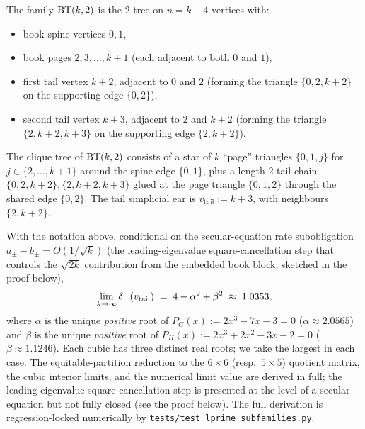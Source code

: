 The family $\mathrm{BT}(k,2)$ is the $2$-tree on $n = k + 4$ vertices with:
\begin{itemize}
\item book-spine vertices $0, 1$,
\item book pages $2, 3, \ldots, k+1$ (each adjacent to both $0$ and $1$),
\item first tail vertex $k+2$, adjacent to $0$ and $2$ (forming the
triangle $\{0, 2, k+2\}$ on the supporting edge $\{0, 2\}$),
\item second tail vertex $k+3$, adjacent to $2$ and $k+2$ (forming the
triangle $\{2, k+2, k+3\}$ on the supporting edge $\{2, k+2\}$).
\end{itemize}
The clique tree of $\mathrm{BT}(k,2)$ consists of a star of $k$ ``page''
triangles $\{0, 1, j\}$ for $j \in \{2, \ldots, k+1\}$ around the
spine edge $\{0, 1\}$, plus a length-$2$ tail chain
$\{0, 2, k+2\}, \{2, k+2, k+3\}$ glued at the page triangle
$\{0, 1, 2\}$ through the shared edge $\{0, 2\}$. The tail simplicial
ear is $v_{\mathrm{tail}} := k + 3$, with neighbours $\{2, k+2\}$.

\begin{proposition}
\label{thm:BT-asymptotic}
With the notation above, conditional on the secular-equation rate
subobligation $a_{\pm} - b_{\pm} = O(1/\sqrt{k})$ (the
leading-eigenvalue square-cancellation step that controls the
$\sqrt{2k}$ contribution from the embedded book block; sketched in the
proof below),
\[
\lim_{k \to \infty} \delta^{-}(v_{\mathrm{tail}})
\;=\; 4 - \alpha^{2} + \beta^{2}
\;\approx\; 1.0353,
\]
where $\alpha$ is the unique \emph{positive} root of
$P_{G}(x) := 2x^{3} - 7x - 3 = 0$ ($\alpha \approx 2.0565$) and
$\beta$ is the unique \emph{positive} root of
$P_{H}(x) := 2x^{3} + 2x^{2} - 3x - 2 = 0$ ($\beta \approx 1.1246$).
Each cubic has three distinct real roots; we take the largest in each
case. The equitable-partition reduction to the $6 \times 6$ (resp.\
$5 \times 5$) quotient matrix, the cubic interior limits, and the
numerical limit value are derived in full; the leading-eigenvalue
square-cancellation step is presented at the level of a secular
equation but not fully closed (see the proof below). The full
derivation is regression-locked numerically by
\texttt{tests/test\_lprime\_subfamilies.py}.
\end{proposition}

